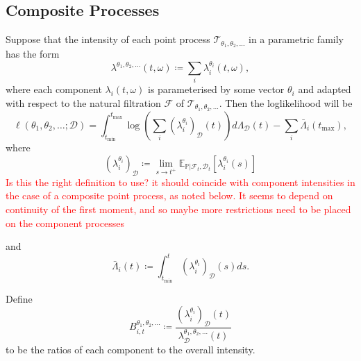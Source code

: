 \documentclass[honours,12pt]{unswthesis}
\numberwithin{equation}{section}
\begin{document}
\subsection{Composite Processes}
Suppose that the intensity of each point process $\mathcal{T}_{\theta_1,\theta_2,\ldots}$ in a parametric family has the form
$$\lambda^{\theta_1,\theta_2,\ldots}(t,\omega) \coloneq \sum_i \lambda_i^{\theta_i}(t,\omega),$$
where each component $\lambda_i(t,\omega)$ is parameterised by some vector $\theta_i$ and adapted with respect to the natural filtration $\mathcal{F}$ of $\mathcal{T}_{\theta_1,\theta_2,\ldots}$. Then the loglikelihood will be
$$\ell(\theta_1,\theta_2,\ldots;\mathcal{D}) = \int_{t_\mathrm{min}}^{t_\mathrm{max}}\log\left(\sum_i \left(\lambda_i^{\theta_i}\right)_{\mathcal{D}}(t)\right)d\Lambda_\mathcal{D}(t)-\sum_i \bar\Lambda_i\left(t_\mathrm{max}\right),$$
where $$(\lambda_i^{\theta_i})_\mathcal{D} \coloneq \lim_{s\to t^+}\mathbb{E}_{\mathbb{P}\vert\mathcal{F}_t,\mathcal{D}_t}\left[\lambda_i^{\theta_i}(s)\right]$$
\textcolor{red}{Is this the right definition to use? it should coincide with component intensities in the case of a composite point process, as noted below. It seems to depend on continuity of the first moment, and so maybe more restrictions need to be placed on the component processes}

and
$$\bar\Lambda_i(t) \coloneq \int_{t_\mathrm{min}}^t \left(\lambda_i^{\theta_i}\right)_\mathcal{D}(s)ds.$$

Define
$$B_{i,t}^{\theta_1,\theta_2,\ldots} \coloneq \frac{\left(\lambda_i^{\theta_i}\right)_\mathcal{D}(t)}{\lambda_\mathcal{D}^{\theta_1,\theta_2,\ldots}(t)}$$
to be the ratios of each component to the overall intensity.
\end{document}
